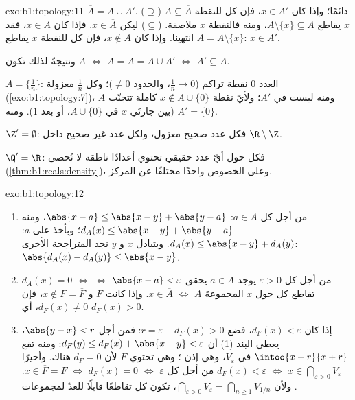 \begin{solution}{exo:b1:topology:11}
$\overline A = A \cup A'$. ($\supseteq$) $A \subseteq \overline
A$ دائمًا؛ وإذا كان $x \in A'$، فإن كل  للنقطة $x$ يقاطع $A
\setminus \{x\} \subseteq A$، ومنه فالنقطة $x$ ملاصقة. ($\subseteq$)
ليكن $x \in \overline A$. فإذا كان $x \in A$، فقد انتهينا. وإذا كان $x \notin A$،
فإن كل  للنقطة $x$ يقاطع $A = A \setminus \{x\}$: $x \in
A'$.

ونتيجةً لذلك تكون $A$  $\iff$ $A = \overline A = A \cup A'$
$\iff$ $A' \subseteq A$.

$A = \{\frac 1n\}$: العدد $0$ نقطة تراكم ($\frac 1n \to
0$، والحدود $\neq 0$)؛ وكل $\frac 1n$ معزولة
(\cref{exo:b1:topology:7})، ومنه ليست في $A'$؛ ولأيّ نقطة $x
\notin A \cup \{0\}$  كاملة تتجنّب $A$ (بين
جارتَي $x$ في $A \cup \{0\}$، أو بعد $1$).
ومنه $A' = \{0\}$.

$\Z' = \emptyset$: فكل عدد صحيح معزول، ولكل عدد غير صحيح
 داخل $\R \setminus \Z$.

$\Q' = \R$: فكل  حول أيّ عدد حقيقي تحتوي أعدادًا ناطقة
لا تُحصى (\cref{thm:b1:reals:density})، وعلى الخصوص واحدًا
مختلفًا عن المركز.
\end{solution}

\begin{solution}{exo:b1:topology:12}
\begin{enumerate}
  \item من أجل كل $a \in A$: $\abs{x - a} \leq \abs{x - y} +
        \abs{y - a}$، ومنه $d_A(x) \leq \abs{x - y} + \abs{y - a}$؛
        وبأخذ  على $a$: $d_A(x) \leq \abs{x - y} +
        d_A(y)$. وبتبادل $x$ و $y$ نجد المتراجحة
        الأخرى: $\abs{d_A(x) - d_A(y)} \leq \abs{x - y}$.
  \item $d_A(x) = 0$ $\iff$ من أجل كل $\varepsilon > 0$ يوجد
        $a \in A$ يحقق $\abs{x - a} < \varepsilon$ $\iff$ تقاطع كل
         حول $x$ المجموعةَ $A$ $\iff$ $x \in \overline A$.
        وإذا كانت $F$  و $x \notin F = \overline F$، فإن
        $d_F(x) \neq 0$، أي $d_F(x) > 0$.
  \item إذا كان $d_F(x) < \varepsilon$، فضع $r = \varepsilon -
        d_F(x) > 0$: فمن أجل $\abs{y - x} < r$، يعطي البند (1) أن
        $d_F(y) \leq d_F(x) + \abs{x - y} < \varepsilon$: ومنه تقع
         $\intoo{x - r}{x + r}$ في $V_\varepsilon$،
        وهي إذن ؛ وهي تحتوي $F$ لأن $d_F = 0$
        هناك. وأخيرًا $x \in \bigcap_{\varepsilon>0}
        V_\varepsilon$ $\iff$ $d_F(x) < \varepsilon$ من أجل كل
        $\varepsilon$ $\iff$ $d_F(x) = 0$ $\iff$ $x \in \overline
        F = F$. ولأن $\bigcap_{\varepsilon > 0} V_\varepsilon =
        \bigcap_{n \geq 1} V_{1/n}$، تكون كل 
        تقاطعًا قابلًا للعدّ لمجموعات .
\end{enumerate}
\end{solution}

